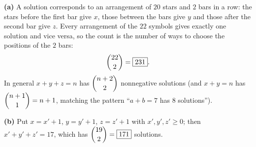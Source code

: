 \textbf{(a)} A solution corresponds to an arrangement of $20$ stars and $2$ bars in a row: the stars before the first bar give $x$, those between the bars give $y$ and those after the second bar give $z$. Every arrangement of the $22$ symbols gives exactly one solution and vice versa, so the count is the number of ways to choose the positions of the $2$ bars:
\[
\dbinom{22}{2}=\boxed{231}.
\]
In general $x+y+z=n$ has $\dbinom{n+2}{2}$ nonnegative solutions (and $x+y=n$ has $\dbinom{n+1}{1}=n+1$, matching the pattern ``$a+b=7$ has $8$ solutions'').

\textbf{(b)} Put $x=x'+1$, $y=y'+1$, $z=z'+1$ with $x',y',z'\ge0$; then $x'+y'+z'=17$, which has $\dbinom{19}{2}=\boxed{171}$ solutions.
